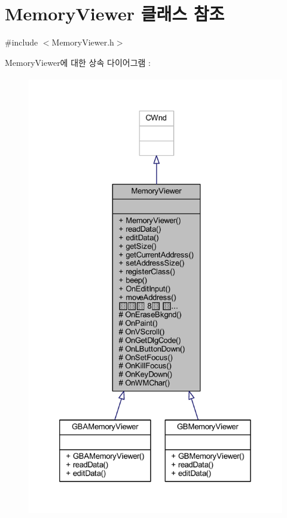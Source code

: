 \hypertarget{class_memory_viewer}{}\section{Memory\+Viewer 클래스 참조}
\label{class_memory_viewer}


{\ttfamily \#include $<$Memory\+Viewer.\+h$>$}



Memory\+Viewer에 대한 상속 다이어그램 \+: \nopagebreak
\begin{figure}[H]
\begin{center}
\leavevmode
\includegraphics[height=550pt]{class_memory_viewer__inherit__graph}
\end{center}
\end{figure}


